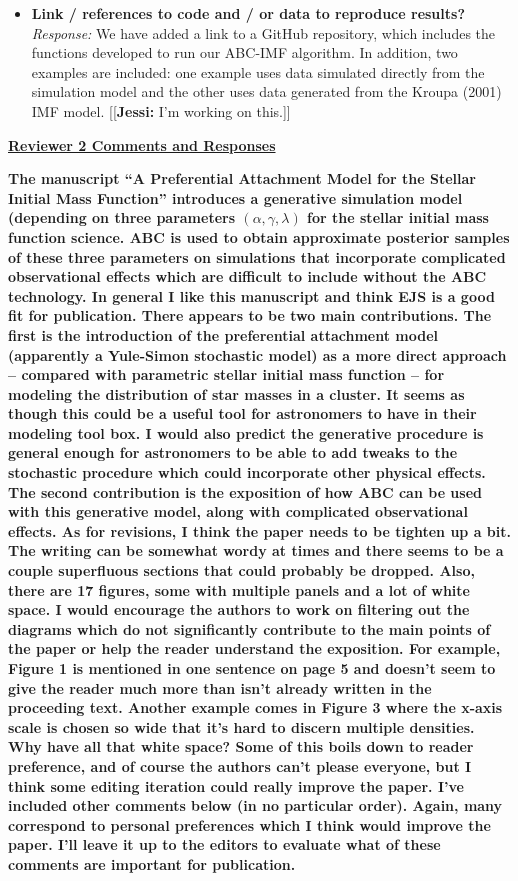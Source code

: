 \documentclass[11pt, oneside]{article}   	%
\newcommand{\jessi}[1]{{\color{blue}[[\textbf{Jessi: }#1]]}}
\begin{document}
\begin{itemize}
\item {\bf Link / references to code and / or data to reproduce results?} \\
\noindent \emph{Response:}  We have added a link to a GitHub repository, which includes the functions developed to run our ABC-IMF algorithm.  In addition, two examples are included:  one example uses data simulated directly from the simulation model and the other uses data generated from the Kroupa (2001) IMF model.
\jessi{I'm working on this.}
\bigskip
\end{itemize}



\noindent \underline{\bf Reviewer 2 Comments and Responses}

{\bf The manuscript ``A Preferential Attachment Model for the Stellar Initial Mass Function'' introduces a generative simulation model (depending on three parameters $(\alpha, \gamma, \lambda)$ for the stellar initial mass function science. ABC is used to obtain approximate posterior samples of these three parameters on simulations that incorporate complicated observational effects which are difficult to include without the ABC technology.
In general I like this manuscript and think EJS is a good fit for publication. There appears to be two main contributions. The first is the introduction of the preferential attachment model (apparently a Yule-Simon stochastic model) as a more direct approach -- compared with parametric stellar initial mass function -- for modeling the distribution of star masses in a cluster. It seems as though this could be a useful tool for astronomers to have in their modeling tool box. I would also predict the generative procedure is general enough for astronomers to be able to add tweaks to the stochastic procedure which could incorporate other physical effects. The second contribution is the exposition of how ABC can be used with this generative model, along with complicated observational effects.
As for revisions, I think the paper needs to be tighten up a bit. The writing can be somewhat wordy at times and there seems to be a couple superfluous sections that could probably be dropped. Also, there are 17 figures, some with multiple panels and a lot of white space. I would encourage the authors to work on filtering out the diagrams which do not significantly contribute to the main points of the paper or help the reader understand the exposition. For example, Figure 1 is mentioned in one sentence on page 5 and doesn't seem to give the reader much more than isn't already written in the proceeding text. Another example comes in Figure 3 where the x-axis scale is chosen so wide that it's hard to discern multiple densities. Why have all that white space? Some of this boils down to reader preference, and of course the authors can't please everyone, but I think some editing iteration could really improve the paper. I've included other comments below (in no particular order). Again, many correspond to personal preferences which I think would improve the paper. I'll leave it up to the editors to evaluate what of these comments are important for publication.
} \\
\end{document}
